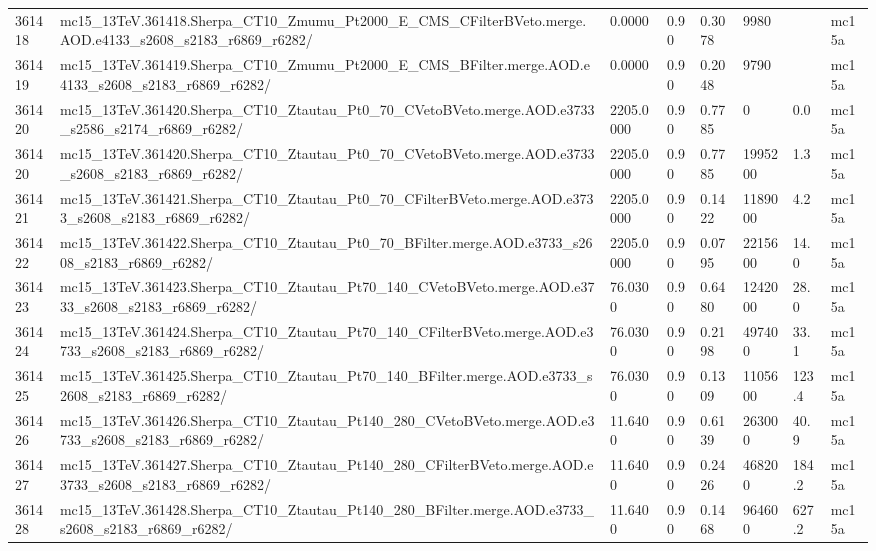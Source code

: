 \begin{sidewaystable}[!htp]
\begin{center}
{\begin{tabular}{llllllll}
361418  &  mc15\_13TeV.361418.Sherpa\_CT10\_Zmumu\_Pt2000\_E\_CMS\_CFilterBVeto.merge.AOD.e4133\_s2608\_s2183\_r6869\_r6282/  &  0.0000  &  0.90  &  0.3078  &  9980  &   &  mc15a \\
361419  &  mc15\_13TeV.361419.Sherpa\_CT10\_Zmumu\_Pt2000\_E\_CMS\_BFilter.merge.AOD.e4133\_s2608\_s2183\_r6869\_r6282/  &  0.0000  &  0.90  &  0.2048  &  9790  &   &  mc15a \\
361420  &  mc15\_13TeV.361420.Sherpa\_CT10\_Ztautau\_Pt0\_70\_CVetoBVeto.merge.AOD.e3733\_s2586\_s2174\_r6869\_r6282/  &  2205.0000  &  0.90  &  0.7785  &  0  &  0.0  &  mc15a \\
361420  &  mc15\_13TeV.361420.Sherpa\_CT10\_Ztautau\_Pt0\_70\_CVetoBVeto.merge.AOD.e3733\_s2608\_s2183\_r6869\_r6282/  &  2205.0000  &  0.90  &  0.7785  &  1995200  &  1.3  &  mc15a \\
361421  &  mc15\_13TeV.361421.Sherpa\_CT10\_Ztautau\_Pt0\_70\_CFilterBVeto.merge.AOD.e3733\_s2608\_s2183\_r6869\_r6282/  &  2205.0000  &  0.90  &  0.1422  &  1189000  &  4.2  &  mc15a \\
361422  &  mc15\_13TeV.361422.Sherpa\_CT10\_Ztautau\_Pt0\_70\_BFilter.merge.AOD.e3733\_s2608\_s2183\_r6869\_r6282/  &  2205.0000  &  0.90  &  0.0795  &  2215600  &  14.0  &  mc15a \\
361423  &  mc15\_13TeV.361423.Sherpa\_CT10\_Ztautau\_Pt70\_140\_CVetoBVeto.merge.AOD.e3733\_s2608\_s2183\_r6869\_r6282/  &  76.0300  &  0.90  &  0.6480  &  1242000  &  28.0  &  mc15a \\
361424  &  mc15\_13TeV.361424.Sherpa\_CT10\_Ztautau\_Pt70\_140\_CFilterBVeto.merge.AOD.e3733\_s2608\_s2183\_r6869\_r6282/  &  76.0300  &  0.90  &  0.2198  &  497400  &  33.1  &  mc15a \\
361425  &  mc15\_13TeV.361425.Sherpa\_CT10\_Ztautau\_Pt70\_140\_BFilter.merge.AOD.e3733\_s2608\_s2183\_r6869\_r6282/  &  76.0300  &  0.90  &  0.1309  &  1105600  &  123.4  &  mc15a \\
361426  &  mc15\_13TeV.361426.Sherpa\_CT10\_Ztautau\_Pt140\_280\_CVetoBVeto.merge.AOD.e3733\_s2608\_s2183\_r6869\_r6282/  &  11.6400  &  0.90  &  0.6139  &  263000  &  40.9  &  mc15a \\
361427  &  mc15\_13TeV.361427.Sherpa\_CT10\_Ztautau\_Pt140\_280\_CFilterBVeto.merge.AOD.e3733\_s2608\_s2183\_r6869\_r6282/  &  11.6400  &  0.90  &  0.2426  &  468200  &  184.2  &  mc15a \\
361428  &  mc15\_13TeV.361428.Sherpa\_CT10\_Ztautau\_Pt140\_280\_BFilter.merge.AOD.e3733\_s2608\_s2183\_r6869\_r6282/  &  11.6400  &  0.90  &  0.1468  &  964600  &  627.2  &  mc15a \\

\end{tabular}}
\end{center}
\end{sidewaystable}
